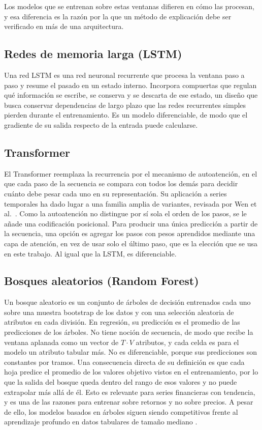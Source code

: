 Los modelos que se entrenan sobre estas ventanas difieren en cómo las procesan, y esa diferencia es la razón por la que un método de explicación debe ser verificado en más de una arquitectura.

\subsection{Redes de memoria larga (LSTM)}

Una red LSTM \cite{hochreiter1997} es una red neuronal recurrente que procesa la ventana paso a paso y resume el pasado en un estado interno. Incorpora compuertas que regulan qué información se escribe, se conserva y se descarta de ese estado, un diseño que busca conservar dependencias de largo plazo que las redes recurrentes simples pierden durante el entrenamiento. Es un modelo diferenciable, de modo que el gradiente de su salida respecto de la entrada puede calcularse.

\subsection{Transformer}

El Transformer \cite{vaswani2017} reemplaza la recurrencia por el mecanismo de autoatención, en el que cada paso de la secuencia se compara con todos los demás para decidir cuánto debe pesar cada uno en su representación. Su aplicación a series temporales ha dado lugar a una familia amplia de variantes, revisada por Wen et al.\ \cite{wen2023}. Como la autoatención no distingue por sí sola el orden de los pasos, se le añade una codificación posicional. Para producir una única predicción a partir de la secuencia, una opción es agregar los pasos con pesos aprendidos mediante una capa de atención, en vez de usar solo el último paso, que es la elección que se usa en este trabajo. Al igual que la LSTM, es diferenciable.

\subsection{Bosques aleatorios (Random Forest)}

Un bosque aleatorio \cite{breiman2001} es un conjunto de árboles de decisión entrenados cada uno sobre una muestra bootstrap de los datos y con una selección aleatoria de atributos en cada división. En regresión, su predicción es el promedio de las predicciones de los árboles. No tiene noción de secuencia, de modo que recibe la ventana aplanada como un vector de $T \cdot V$ atributos, y cada celda es para el modelo un atributo tabular más. No es diferenciable, porque sus predicciones son constantes por tramos. Una consecuencia directa de su definición es que cada hoja predice el promedio de los valores objetivo vistos en el entrenamiento, por lo que la salida del bosque queda dentro del rango de esos valores y no puede extrapolar más allá de él. Esto es relevante para series financieras con tendencia, y es una de las razones para entrenar sobre retornos y no sobre precios. A pesar de ello, los modelos basados en árboles siguen siendo competitivos frente al aprendizaje profundo en datos tabulares de tamaño mediano \cite{grinsztajn2022}.

